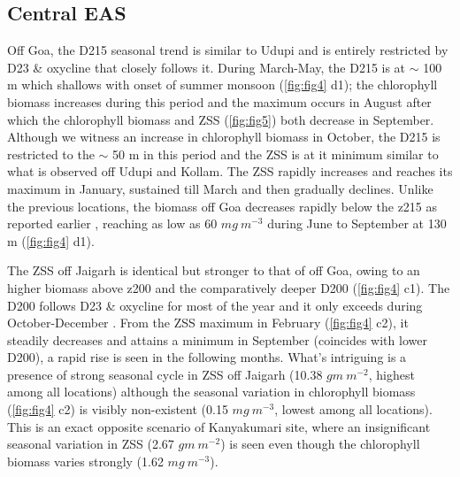 \documentclass{article}
\begin{document}
	\subsection{Central EAS}
	Off Goa, the D215 seasonal trend is similar to Udupi and is entirely restricted by D23 \& oxycline that closely follows it. During March-May, the D215 is at $\sim$ 100 m which shallows with onset of summer monsoon (\cref{fig:fig4} d1); the chlorophyll biomass increases during this period and the maximum occurs in August after which the chlorophyll biomass and ZSS (\cref{fig:fig5}) both decrease in September. Although we witness an increase in chlorophyll biomass in October, the D215 is restricted to the $\sim$ 50 m in this period  and the ZSS is at it minimum  similar to what is observed off Udupi and Kollam. The ZSS rapidly increases and reaches its maximum in January, sustained till March and then gradually declines. Unlike the previous locations, the biomass off Goa decreases rapidly below the z215 as reported earlier \citep{aparna2022seasonal}, reaching as low as 60 $mg \ m^{-3}$ during June to September at 130 m (\cref{fig:fig4} d1).
	 

	
	The ZSS off Jaigarh is identical but stronger to that of off Goa, owing to an higher biomass above z200 and the comparatively deeper D200 (\cref{fig:fig4} c1). The D200 follows D23 \& oxycline for most of the year and it only exceeds during October-December .  From the ZSS maximum in February (\cref{fig:fig4} c2), it steadily decreases and attains a minimum in September (coincides with lower D200), a rapid rise is seen in the following months. What's intriguing is a presence of strong seasonal cycle in ZSS off Jaigarh (10.38 $gm\ m^{-2}$, highest among all locations) although the seasonal variation in chlorophyll biomass (\cref{fig:fig4} c2) is visibly non-existent (0.15 $mg\ m^{-3}$, lowest among all locations). This is an exact opposite scenario of Kanyakumari site, where an insignificant seasonal variation in ZSS (2.67 $gm\ m^{-2}$) is seen even though the chlorophyll biomass varies strongly (1.62 $mg\ m^{-3}$). 
		
\end{document}
